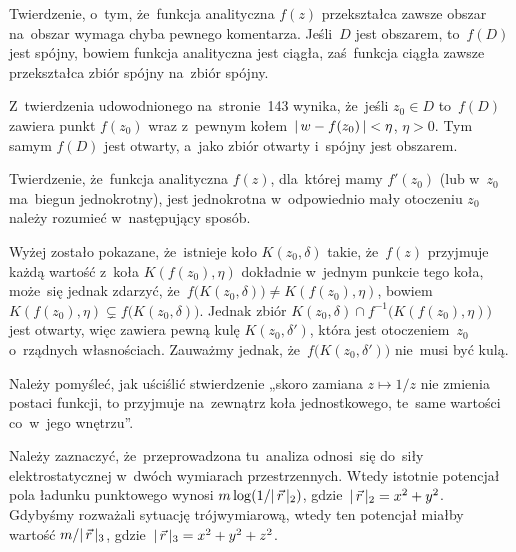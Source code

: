 \documentclass[a4paper,11pt]{article}
\begin{document}
\vspace{\spaceFour}



\start {} Twierdzenie, o~tym, że~funkcja analityczna $f( z )$
przekształca zawsze obszar na~obszar wymaga chyba pewnego komentarza.
Jeśli~$D$ jest obszarem, to~$f( D )$ jest spójny, bowiem funkcja
analityczna jest ciągła, zaś~funkcja ciągła zawsze przekształca zbiór
spójny na~zbiór spójny.

Z~twierdzenia udowodnionego na~stronie~143 wynika, że~jeśli
$z_{ 0 } \in D$ to~$f( D )$ zawiera punkt $f( z_{ 0 } )$ wraz z~pewnym
kołem~$|\, {  w - f( z_{ 0 } )  } \,| < \eta$, $\eta > 0$. Tym samym
$f( D )$ jest otwarty, a~jako zbiór otwarty i~spójny jest obszarem.

\vspace{\spaceFour}



\start {} Twierdzenie, że~funkcja analityczna $f( z )$,
dla~której mamy $f'( z_{ 0 } )$ (lub w~$z_{ 0 }$ ma~biegun
jednokrotny), jest jednokrotna w~odpowiednio mały otoczeniu $z_{ 0 }$
należy rozumieć w~następujący sposób.

Wyżej zostało pokazane, że~istnieje koło $K( z_{ 0 }, \delta )$ takie,
że~$f( z )$ przyjmuje każdą wartość z~koła $K( f( z_{ 0 } ), \eta )$
dokładnie w~jednym punkcie tego koła, może~się jednak zdarzyć,
że~$f\big( K( z_{ 0 }, \delta ) \big) \neq K( f( z_{ 0 } ), \eta )$, bowiem
$K( f( z_{ 0 } ), \eta ) \subsetneq f\big( K( z_{ 0 }, \delta ) \big)$. Jednak
zbiór $K( z_{ 0 }, \delta ) \cap f^{ -1 }\big( K( f( z_{ 0 } ), \eta ) \big)$
jest otwarty, więc zawiera pewną kulę $K( z_{ 0 }, \delta' )$, która
jest otoczeniem~$z_{ 0 }$ o~rządnych własnościach. Zauważmy jednak,
że~$f\big( K( z_{ 0 }, \delta' ) \big)$ nie~musi być kulą.

\vspace{\spaceFour}



\start {} Należy pomyśleć, jak uściślić stwierdzenie „skoro
zamiana $z \mapsto 1 / z$ nie zmienia postaci funkcji, to przyjmuje
na~zewnątrz koła jednostkowego, te~same wartości co~w~jego wnętrzu”.

\vspace{\spaceFour}



\start {} Należy zaznaczyć, że~przeprowadzona tu~analiza
odnosi~się do~siły elektrostatycznej w~dwóch wymiarach przestrzennych.
Wtedy istotnie potencjał pola ładunku punktowego wynosi
$m \log(1 / |\, {  \vec{ r }  } \,|_{ 2 } )$,
gdzie~$|\, {  \vec{ r }  } \,|_{ 2 } = x^{ 2 } + y^{ 2 }$. Gdybyśmy rozważali
sytuację trójwymiarową, wtedy ten potencjał miałby wartość
$m / |\, {  \vec{ r }  } \,|_{ 3 }$,
gdzie~$|\, {  \vec{ r }  } \,|_{ 3 } = x^{ 2 } + y^{ 2 } + z^{ 2 }$.
\end{document}
